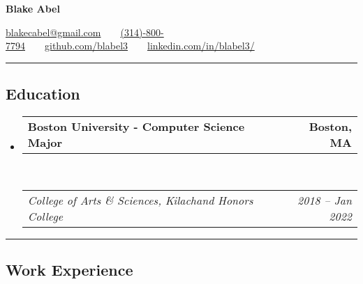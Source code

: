 \documentclass[11pt,letterpaper]{article}
\makeatletter
\newcommand{\headerrow}[2]
{\begin{tabular*}{\linewidth}{l@{\extracolsep{\fill}}r}
	#1 &
	#2 \\
\end{tabular*}}
\makeatother
\begin{document}
\begin{center}
{\LARGE \textbf{Blake Abel}}

\href{mailto:blakecabel@gmail.com}{blakecabel@gmail.com}\ \ \textbullet \ \ \href{tel:314-800-7794}{(314)-800-7794}\ \ \textbullet \ \ \href{https://github.com/blabel3}{github.com/blabel3}\ \ \textbullet \ \ \href{https://www.linkedin.com/in/blabel3/}{linkedin.com/in/blabel3/}

\end{center}

\hrule
\vspace{-0.4em}
\subsection*{Education}

\begin{itemize}
	\parskip=0.1em

	\item 
	\headerrow
		{\textbf{Boston University - Computer Science Major}}
		{\textbf{Boston, MA}}
	\\
	\headerrow
		{\emph{College of Arts \& Sciences, Kilachand Honors College}}
		{\emph{2018 -- Jan 2022}}
	

\end{itemize}

\hrule
\vspace{-0.4em}
\subsection*{Work Experience}
\end{document}
